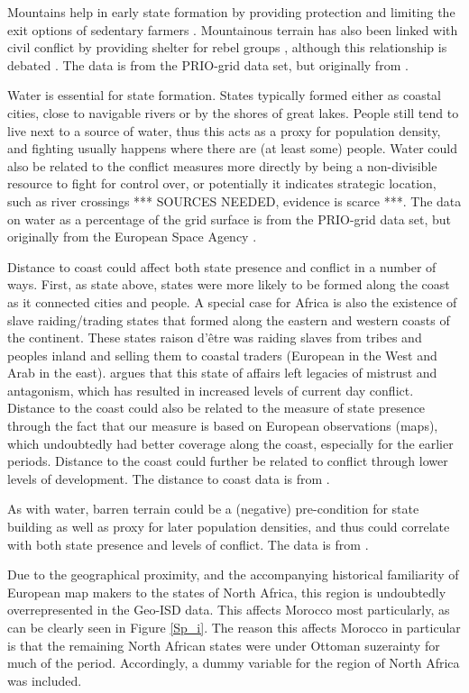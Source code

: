 \documentclass[12pt]{article}
\begin{document}
Mountains help in early state formation by providing protection and limiting the
exit options of sedentary farmers \citep{Carneiro1988}. Mountainous terrain has
also been linked with civil conflict by providing shelter for rebel groups
\citep{Hegre2006}, although this relationship is debated 
\citep{Buhaug2002}. The data is from the PRIO-grid data set, but originally 
from \citet{Blyth2002}. 

Water is essential for state formation. States typically formed either as
coastal cities, close to navigable rivers or by the shores of great lakes.
People still tend to live next to a source of water, thus this acts as a proxy
for population density, and fighting usually happens where there are (at least
some) people.  Water could also be related to the conflict measures more
directly by being a non-divisible resource to fight for control over, or
potentially it indicates strategic location, such as river crossings *** SOURCES
NEEDED, evidence is scarce ***. The data on water as a percentage of the grid
surface is from the PRIO-grid data set, but originally from the European Space
Agency \citep{Bontemps2009}.

Distance to coast could affect both state presence and conflict in a number of
ways. First, as state above, states were more likely to be formed along the
coast as it connected cities and people. A special case for Africa is also the
existence of slave raiding/trading states that formed along the eastern and
western coasts of the continent. These states raison d'être was raiding slaves
from tribes and peoples inland and selling them to coastal traders (European in
the West and Arab in the east). \citet{Nunn2008} argues that this state of
affairs left legacies of mistrust and antagonism, which has resulted in
increased levels of current day conflict. Distance to the coast could also be
related to the measure of state presence through the fact that our measure is
based on European observations (maps), which undoubtedly had better coverage
along the coast, especially for the earlier periods. Distance to the coast could
further be related to conflict through lower levels of development. The distance
to coast data is from \citet{Wessel1996}.

As with water, barren terrain could be a (negative) pre-condition for state
building as well as proxy for later population densities, and thus could
correlate with both state presence and levels of conflict. The data is from
\citet{Bontemps2009}.

Due to the geographical proximity, and the accompanying
historical familiarity of European map makers to the states of North Africa,
this region is undoubtedly overrepresented in the Geo-ISD data. This affects
Morocco most particularly, as can be clearly seen in Figure \ref{Sp_i}. The
reason this affects Morocco in particular is that the remaining North African
states were under Ottoman suzerainty for much of the period. Accordingly, a
dummy variable for the region of North Africa was included.
\end{document}
